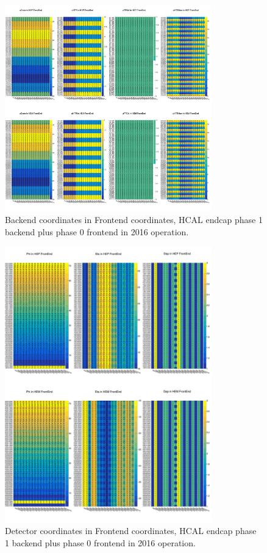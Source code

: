 \begin{figure}[htbp]
 \begin{center}
  \includegraphics[width=0.8\textwidth]{figures/c3/c3_cms_hcalhelmapfebe.png}
 \end{center}
 \caption{Backend coordinates in Frontend coordinates, HCAL endcap phase 1 backend plus phase 0 frontend in 2016 operation.}
 \label{fig:c3cmshcalhelmapfebe}
\end{figure}

\begin{figure}[htbp]
 \begin{center}
  \includegraphics[width=0.8\textwidth]{figures/c3/c3_cms_hcalhelmapfegeo.png}
 \end{center}
 \caption{Detector coordinates in Frontend coordinates, HCAL endcap phase 1 backend plus phase 0 frontend in 2016 operation.}
 \label{fig:c3cmshcalhelmapfegeo}
\end{figure}



